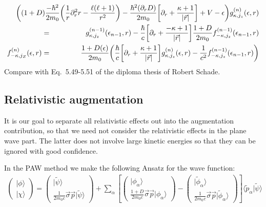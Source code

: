 \documentclass[11pt,a4paper]{report}
\begin{document}
\begin{eqnarray}
&&\hspace{-2cm}\biggl(
(1+D)\frac{-\hbar^2}{2m_0}\biggl(\frac{1}{r}\partial_r^2r
-\frac{\ell(\ell+1)}{r^2}\biggr)
-\frac{\hbar^2(\partial_r D)}{2m_0}
\biggl[\partial_r
+\frac{\kappa+1}{|\vec{r}|}\biggr]
+V-\epsilon \biggr)g^{(n)}_{\kappa,j_z}(\epsilon,r)
\nonumber\\
&=&
g^{(n-1)}_{\kappa,j_z}(\epsilon_{n-1},r)
-
\frac{\hbar}{c}\biggl[\partial_r+\frac{-\kappa+1}{|\vec{r}|}\biggr]
\frac{1+D}{ 2m_0 }
f_{-\kappa,j_z}^{(n-1)}(\epsilon_{n-1},r)
\nonumber\\
f_{-\kappa,j_Z}^{(n)}(\epsilon,r)
&=&\frac{1+D(\epsilon)}{2 m_0}
\biggl(\frac{\hbar}{c}\biggl[\partial_r+\frac{\kappa+1}{|\vec{r}|}\biggr]
g_{\kappa,j_z}^{(n)}(\epsilon,r)
-
\frac{1}{c^2}f_{-\kappa,j_z}^{(n-1)}(\epsilon_{n-1},r)\biggr)
\end{eqnarray}
Compare with Eq.~5.49-5.51 of the diploma thesis of Robert Schade.

\subsection{Relativistic augmentation}
It is our goal to separate all relativistic effects out into the
augmentation contribution, so that we need not consider the
relativistic effects in the plane wave part. The latter does not
involve large kinetic energies so that they can be ignored with good
confidence.

In the PAW method we make the following Ansatz for the wave function:
\begin{eqnarray}
\left(\begin{array}{c}|\phi\rangle\\|\chi\rangle\end{array}\right)
=
\left(
\begin{array}{c}|\tilde{\psi}\rangle\\\frac{1}{2m_0c}\vec{\sigma}\vec{p}|\tilde\psi\rangle\end{array}\right)
+
\sum_\alpha
\left[
\left(
\begin{array}{c}|\phi_\alpha\rangle\\
\frac{1+D}{2m_0c}\vec{\sigma}\vec{p}|\phi_\alpha\rangle\end{array}\right)
-
\left(
\begin{array}{c}|\tilde{\phi}_\alpha\rangle\\
\frac{1}{2m_0c}\vec{\sigma}\vec{p}|\tilde{\phi}_\alpha\rangle\end{array}\right)
\right]
\langle\tilde{p}_\alpha|\tilde\psi\rangle
\end{eqnarray}
\end{document}
